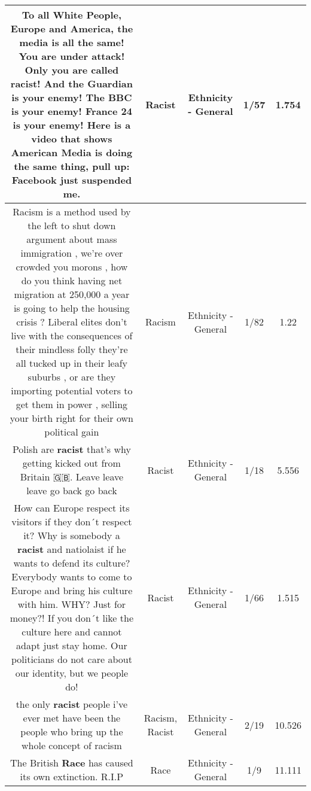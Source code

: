 \documentclass[11pt]{article}
\newlength\mylength
\begin{document}
\begin{center}
\begin{longtable}{|C{.65\mylength}|C{.30\mylength}|C{.12\mylength}|C{.12\mylength}|C{.12\mylength}|}
  \small To all White People,   Europe and America,    the media is all the same!   You are under attack!   Only you are called \textbf{racist}!   And the Guardian is your enemy!   The BBC is your enemy!   France 24 is your enemy!   Here is a video that shows American Media is doing the same thing,   pull up:   Facebook just suspended me.\normalsize   & Racist & Ethnicity - General & 1/57 & 1.754 \\  \hline
  \small Racism is a method used by the left to shut down argument about mass immigration , we're over crowded you morons , how do you think having net migration at 250,000 a year is going to help the housing crisis ? Liberal elites don't live with the consequences of their mindless folly they're all tucked up in their leafy suburbs , or are they importing potential voters to get them in power , selling your birth right for their own political gain\normalsize   & Racism & Ethnicity - General & 1/82 & 1.22 \\  \hline
  \small Polish are \textbf{racist} that's why getting kicked out from Britain 🇬🇧. Leave leave leave go back go back\normalsize   & Racist & Ethnicity - General & 1/18 & 5.556 \\  \hline
  \small How can Europe respect its visitors if they don´t respect it? Why is somebody a \textbf{racist} and natiolaist  if he wants to defend its culture? Everybody wants to come to Europe and bring his culture with him. WHY? Just for money?! If you don´t like the culture here and cannot adapt just stay home.  Our politicians do not care about our identity, but we people do!\normalsize   & Racist & Ethnicity - General & 1/66 & 1.515 \\  \hline
  \small the only \textbf{racist} people i've ever met have been the people who bring up the whole concept of racism\normalsize   & Racism, Racist & Ethnicity - General & 2/19 & 10.526 \\  \hline
  \small The British \textbf{Race} has caused its own extinction.   R.I.P\normalsize   & Race & Ethnicity - General & 1/9 & 11.111 \\  \hline

\end{longtable}
\end{center}
\end{document}
